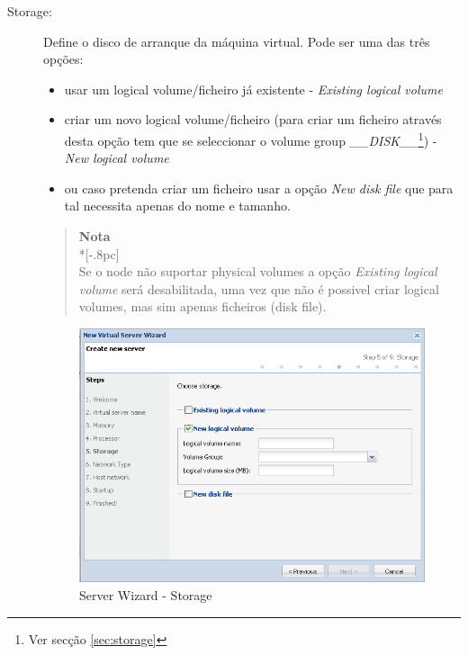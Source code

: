 \begin{description}
	\item[Storage:] Define o disco de arranque da máquina virtual. Pode ser uma das três opções:
\begin{itemize}
	\item usar um logical volume/ficheiro já existente - \emph{Existing logical volume}
	\item criar um novo logical volume/ficheiro (para criar um ficheiro através desta opção tem que se seleccionar o volume group \emph{\_\_DISK\_\_}\footnote{Ver secção \ref{sec:storage}}) - \emph{New logical volume}
	\item  ou caso pretenda criar um ficheiro usar a opção \emph{New disk file} que para tal necessita apenas do nome e tamanho.
\end{itemize}

		\begin{quote}
			{\large \bf Nota} \\*[-.8pc]
			\underline{\hspace{6in}} \\
			Se o node não suportar physical volumes a opção \emph{Existing logical volume} será desabilitada, uma vez que não é possivel criar logical volumes, mas sim apenas ficheiros (disk file).
		\end{quote}
	
		\begin{figure}[H]
        		\begin{center}
	        	\includegraphics[scale=0.5]{screenshots/server_createwiz_storage.png}
	        	\caption{Server Wizard - Storage}
		        \label{fig:server_createwiz_storage}
        		\end{center}
		\end{figure}


\end{description}
